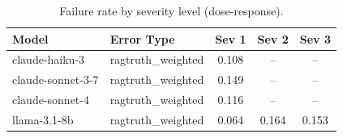 \begin{table}[t]
\centering
\caption{Failure rate by severity level (dose-response).}
\label{tab:severity}
\begin{tabular}{llccc}
\toprule
Model & Error Type & Sev 1 & Sev 2 & Sev 3 \\
\midrule
claude-haiku-3 & ragtruth_weighted & 0.108 & -- & -- \\
claude-sonnet-3-7 & ragtruth_weighted & 0.149 & -- & -- \\
claude-sonnet-4 & ragtruth_weighted & 0.116 & -- & -- \\
llama-3.1-8b & ragtruth_weighted & 0.064 & 0.164 & 0.153 \\
\bottomrule
\end{tabular}
\end{table}